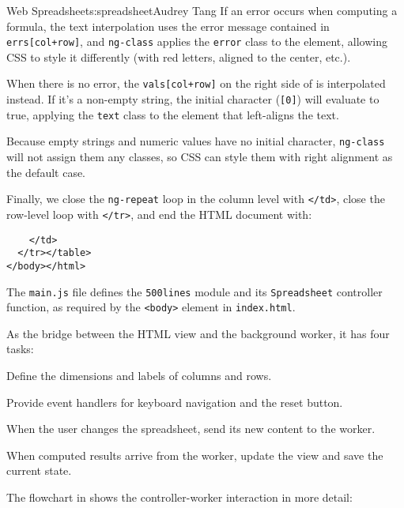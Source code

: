 \begin{aosachapter}{Web Spreadsheet}{s:spreadsheet}{Audrey Tang}
If an error occurs when computing a formula, the text interpolation uses
the error message contained in \texttt{errs{[}col+row{]}}, and
\texttt{ng-class} applies the \texttt{error} class to the element,
allowing CSS to style it differently (with red letters, aligned to the
center, etc.).

When there is no error, the \texttt{vals{[}col+row{]}} on the right side
of \texttt{\textbar{}\textbar{}} is interpolated instead. If it's a
non-empty string, the initial character (\texttt{{[}0{]}}) will evaluate
to true, applying the \texttt{text} class to the element that
left-aligns the text.

Because empty strings and numeric values have no initial character,
\texttt{ng-class} will not assign them any classes, so CSS can style
them with right alignment as the default case.

Finally, we close the \texttt{ng-repeat} loop in the column level with
\texttt{\textless{}/td\textgreater{}}, close the row-level loop with
\texttt{\textless{}/tr\textgreater{}}, and end the HTML document with:

\begin{verbatim}
    </td>
  </tr></table>
</body></html>
\end{verbatim}

\label{js-main-controller}

The \texttt{main.js} file defines the \texttt{500lines} module and its
\texttt{Spreadsheet} controller function, as required by the
\texttt{\textless{}body\textgreater{}} element in \texttt{index.html}.

As the bridge between the HTML view and the background worker, it has
four tasks:

\begin{aosaitemize}

\item
  Define the dimensions and labels of columns and rows.
\item
  Provide event handlers for keyboard navigation and the reset button.
\item
  When the user changes the spreadsheet, send its new content to the
  worker.
\item
  When computed results arrive from the worker, update the view and save
  the current state.
\end{aosaitemize}

The flowchart in  shows the
controller-worker interaction in more detail:


\end{aosachapter}
